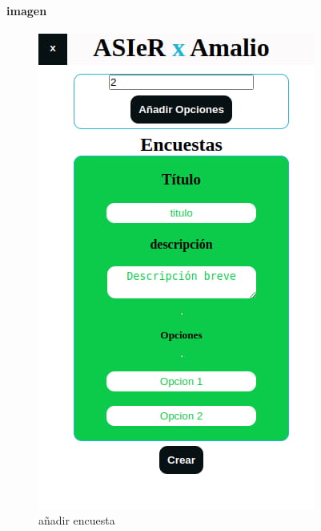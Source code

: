 \documentclass[a4paper]{article}
\begin{document}
 \paragraph{imagen}
 \begin{figure}[ht]
    \includegraphics[scale=0.5]{./assets/add-encuesta.jpg}
    \centering
    \caption{añadir encuesta}
    \label{fig:add-encuesta}
 \end{figure}
 \newpage
 
\end{document}
